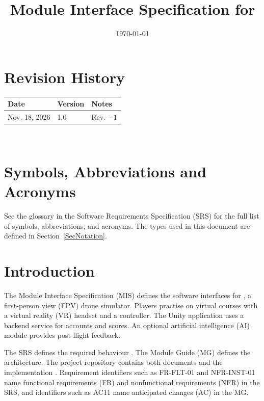 \documentclass[12pt, titlepage]{article}
\begin{document}
\title{Module Interface Specification for \progname{}}

\author{\authname}

\date{\today}

\hypersetup{pageanchor=false}
\maketitle
\hypersetup{pageanchor=true}


\section{Revision History}

\begin{tabularx}{\textwidth}{p{3cm}p{2cm}X}
\toprule {\bf Date} & {\bf Version} & {\bf Notes}\\
\midrule
Nov. 18, 2026 & 1.0 & Rev. $-1$\\
\bottomrule
\end{tabularx}

~\newpage

\section{Symbols, Abbreviations and Acronyms}

See the glossary in the Software Requirements Specification (SRS)
\citep{SRS} for the full list of symbols, abbreviations, and acronyms. The
types used in this document are defined in Section~\ref{SecNotation}.


\newpage

\setcounter{tocdepth}{2}
\tableofcontents

\newpage


\section{Introduction}

The Module Interface Specification (MIS) defines the software interfaces
for \progname{}, a first-person view (FPV) drone simulator. Players practise
on virtual courses with a virtual reality (VR) headset and a controller. The
Unity application
uses a backend service for accounts and scores. An optional artificial
intelligence (AI) module provides post-flight feedback.

The SRS defines the required
behaviour \citep{SRS}. The Module Guide (MG) defines the architecture.
The project repository contains both documents and the implementation
\citep{FPVRRepository}. Requirement identifiers such as FR-FLT-01 and
NFR-INST-01 name functional requirements (FR) and nonfunctional requirements
(NFR) in the SRS, and identifiers such as AC11 name anticipated changes (AC)
in the MG.
\end{document}
